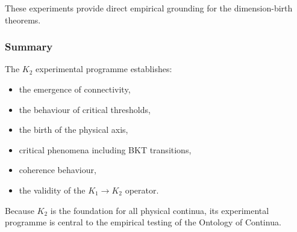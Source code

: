 These experiments provide direct empirical grounding for the 
dimension-birth theorems.



\subsubsection{Summary}

The $K_2$ experimental programme establishes:

\begin{itemize}
    \item the emergence of connectivity,
    \item the behaviour of critical thresholds,
    \item the birth of the physical axis,
    \item critical phenomena including BKT transitions,
    \item coherence behaviour,
    \item the validity of the $K_1\rightarrow K_2$ operator.
\end{itemize}

Because $K_2$ is the foundation for all physical continua, 
its experimental programme is central to the empirical testing of the 
Ontology of Continua.
